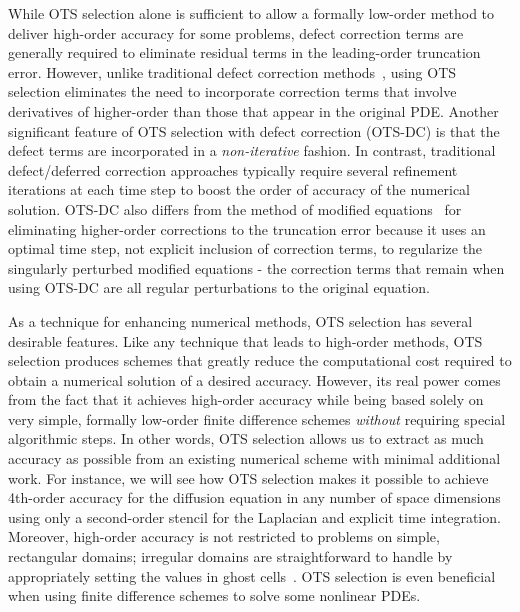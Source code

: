 \documentclass[fleqn,12pt,twoside]{article}
\begin{document}
While OTS selection alone is sufficient to allow a formally low-order method to
deliver high-order accuracy for some problems, defect correction terms are
generally required to eliminate residual terms in the leading-order truncation
error.  However, unlike traditional defect correction 
methods~\cite{pereyra_1968,stetter_1978,gustafsson_2002,kress_2002,kress_2006}, 
using OTS selection eliminates the need to incorporate correction terms that
involve derivatives of higher-order than those that appear in the original PDE.
Another significant feature of OTS selection with defect correction (OTS-DC)
is that the defect terms are incorporated in a \emph{non-iterative} fashion.
In contrast, traditional defect/deferred correction approaches typically
require several refinement iterations at each time step to boost the order of
accuracy of the numerical solution.  OTS-DC also differs from the method of
modified equations~\cite{griffiths_1986} for eliminating higher-order
corrections to the truncation error because it uses an optimal time
step, not explicit inclusion of correction terms, to regularize the
singularly perturbed modified equations - the correction terms that remain
when using OTS-DC are all regular perturbations to the original equation.

As a technique for enhancing numerical methods, OTS selection has several
desirable features.  Like any technique that leads to high-order methods,
OTS selection produces schemes that greatly reduce the computational cost
required to obtain a numerical solution of a desired accuracy.  However, its
real power comes from the fact that it achieves high-order accuracy while
being based solely on very simple, formally low-order finite difference
schemes \emph{without} requiring special algorithmic steps.  In other words,
OTS selection allows us to extract as much accuracy as possible from an
existing numerical scheme with minimal additional work.  For instance, we will
see how OTS selection makes it possible to achieve 4th-order accuracy for the
diffusion equation in any number of space dimensions using only a second-order
stencil for the Laplacian and explicit time integration.  Moreover, high-order
accuracy is not restricted to problems on simple, rectangular domains;
irregular domains are straightforward to handle by appropriately setting the
values in ghost cells~\cite{gibou_2005,ito_2005,fedkiw_1999,osher_fedkiw_book}.  
OTS selection is even beneficial when using finite difference schemes to solve
some nonlinear PDEs.  
\end{document}
